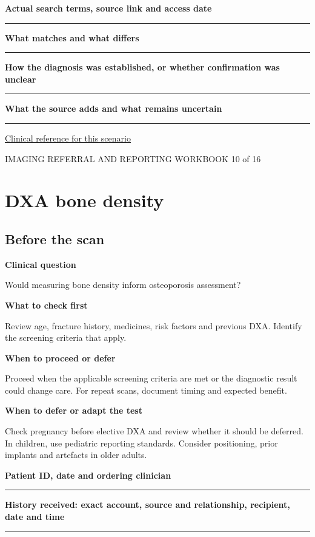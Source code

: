 \documentclass[11pt,a4paper]{article}
\newcommand{\record}[1]{\textbf{#1}\par\vspace{0.55\baselineskip}\hrule\vspace{0.35\baselineskip}}
\begin{document}
\record{Actual search terms, source link and access date}

\record{What matches and what differs}

\record{How the diagnosis was established, or whether confirmation was unclear}

\record{What the source adds and what remains uncertain}

\small\href{https://www.uspreventiveservicestaskforce.org/uspstf/recommendation/breast-cancer-screening}{Clinical reference for this scenario}

\normalsize

\newpage

{\small IMAGING REFERRAL AND REPORTING WORKBOOK \hfill 10 of 16}

\section*{DXA bone density}

\subsection*{Before the scan}

\textbf{Clinical question}\par Would measuring bone density inform osteoporosis assessment?\par

\textbf{What to check first}\par Review age, fracture history, medicines, risk factors and previous DXA. Identify the screening criteria that apply.\par

\textbf{When to proceed or defer}\par Proceed when the applicable screening criteria are met or the diagnostic result could change care. For repeat scans, document timing and expected benefit.\par

\textbf{When to defer or adapt the test}\par Check pregnancy before elective DXA and review whether it should be deferred. In children, use pediatric reporting standards. Consider positioning, prior implants and artefacts in older adults.\par

\record{Patient ID, date and ordering clinician}

\record{History received: exact account, source and relationship, recipient, date and time}
\end{document}
